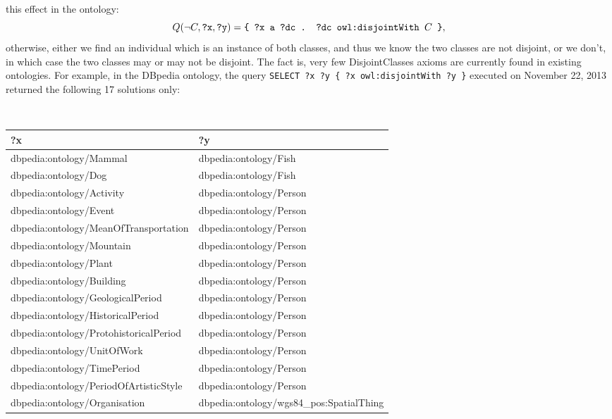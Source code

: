 \documentclass[a4paper]{article}
\newcounter{ex}
\begin{document}
\begin{itemize}
  this effect in the ontology:
  \begin{equation}\label{eq:negation-with-disjointWith}
    Q(\neg C, \mbox{\tt ?x}, \mbox{\tt ?y}) =
      \mbox{\tt \{ ?x a ?dc . ?dc owl:disjointWith }
      C \mbox{\tt\ \}},
  \end{equation}
  otherwise, either we find an individual which is an instance of both classes,
  and thus we know the two classes are not disjoint, or we don't,
  in which case the two classes may or may not be disjoint.
  The fact is, very few \textsf{DisjointClasses} axioms are currently found in existing
  ontologies. For example, in the DBpedia ontology, the query
  \texttt{SELECT ?x ?y \{ ?x owl:disjointWith ?y \}} executed on November 22, 2013
  returned the following 17 solutions only:
  \begin{center}\scriptsize\tt
  \begin{tabular}{|l|l|}
  \hline
    \bf ?x & \bf ?y \\
  \hline
  dbpedia:ontology/Mammal                & dbpedia:ontology/Fish \\
  dbpedia:ontology/Dog                   & dbpedia:ontology/Fish \\
  dbpedia:ontology/Activity              & dbpedia:ontology/Person \\
  dbpedia:ontology/Event                 & dbpedia:ontology/Person \\
  dbpedia:ontology/MeanOfTransportation  & dbpedia:ontology/Person \\
  dbpedia:ontology/Mountain              & dbpedia:ontology/Person \\
  dbpedia:ontology/Plant                 & dbpedia:ontology/Person \\
  dbpedia:ontology/Building              & dbpedia:ontology/Person \\
  dbpedia:ontology/GeologicalPeriod      & dbpedia:ontology/Person \\
  dbpedia:ontology/HistoricalPeriod      & dbpedia:ontology/Person \\
  dbpedia:ontology/ProtohistoricalPeriod & dbpedia:ontology/Person \\
  dbpedia:ontology/UnitOfWork            & dbpedia:ontology/Person \\
  dbpedia:ontology/TimePeriod            & dbpedia:ontology/Person \\
  dbpedia:ontology/PeriodOfArtisticStyle & dbpedia:ontology/Person \\
  dbpedia:ontology/Organisation          & dbpedia:ontology/wgs84\_pos:SpatialThing \\

\end{tabular}
\end{center}
\end{itemize}
\end{document}

